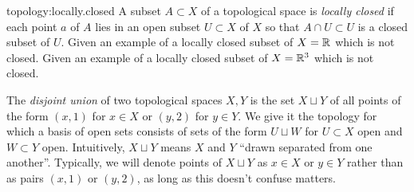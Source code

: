 \begin{problem}{topology:locally.closed}
A subset \(A \subset X\) of a topological space is \emph{locally closed} if each point \(a\) of \(A\) lies in an open subset \(U \subset X\) of \(X\) so that \(A \cap U \subset U\) is a closed subset of \(U\).
Given an example of a locally closed subset of \(X=\mathbb{R}^{}\) which is not closed.
Given an example of a locally closed subset of \(X=\mathbb{R}^{3}\) which is not closed.
\end{problem}
The \emph{disjoint union} of two topological spaces \(X, Y\) is the set \(X \sqcup Y\) of all points of the form \((x,1)\) for \(x \in X\) or \((y,2)\) for \(y \in Y\).
We give it the topology for which a basis of open sets consists of sets of the form \(U \sqcup W\) for \(U \subset X\) open and \(W \subset Y\) open.
Intuitively, \(X \sqcup Y\) means \(X\) and \(Y\) ``drawn separated from one another''.
Typically, we will denote points of \(X\sqcup Y\) as \(x \in X\) or \(y \in Y\) rather than as pairs \((x,1)\) or \((y,2)\), as long as this doesn't confuse matters.

